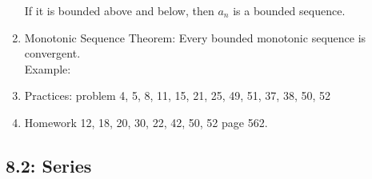 \documentclass[12pt]{amsart}
\begin{document}
\begin{enumerate}
	If it is bounded above and below, then $a_n $ is a bounded sequence.
	
	\item Monotonic Sequence Theorem: Every bounded monotonic sequence is convergent. \\
		Example: \\
	
	\item Practices: problem 4, 5, 8, 11, 15, 21, 25, 49, 51, 37, 38, 50, 52\\
	
	\item Homework 12, 18, 20, 30, 22, 42, 50, 52 page 562. 
\end{enumerate}
\newpage
\subsection{8.2: Series}
\end{document}
